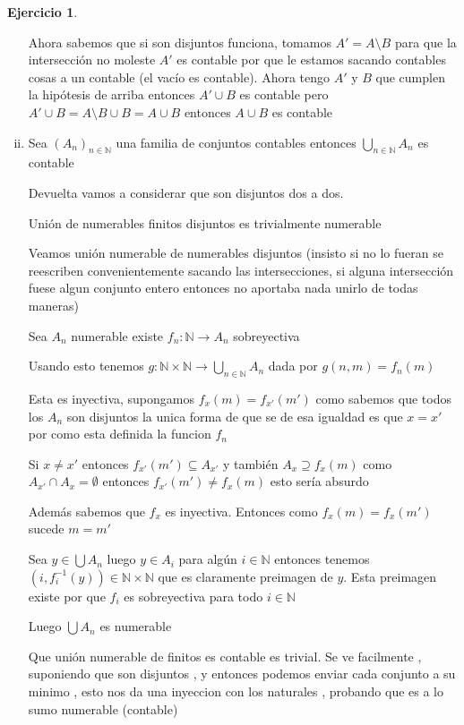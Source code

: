 \documentclass[12pt]{article}
\newcommand{\N}{\mathbb{N}}
\newcommand{\ra}{\rightarrow}
\theoremstyle{definition}
\newtheorem{ej}{Ejercicio}
\begin{document}
\begin{ej}
\begin{enumerate}[i.]
Ahora sabemos que si son disjuntos funciona, tomamos $A' = A \setminus B$ para que la intersección no moleste $A'$ es contable por que le estamos sacando contables cosas a un contable (el vacío es contable). Ahora tengo $A'$ y $B$ que cumplen la hipótesis de arriba entonces $A'\cup B$ es contable pero $A'\cup B = A \setminus B \cup B = A \cup B$ entonces $A \cup B$ es contable
      



  \item Sea $(A_{n})_{n \in \N}$ una familia de conjuntos contables entonces $\bigcup_{n \in \N} A_{n}$ es contable
  
    Devuelta vamos a considerar que son disjuntos dos a dos.

    Unión de numerables finitos disjuntos es trivialmente numerable

    Veamos unión numerable de numerables disjuntos (insisto si no lo fueran se reescriben convenientemente sacando las intersecciones, si alguna intersección fuese algun conjunto entero entonces no aportaba nada unirlo de todas maneras)

    Sea $A_{n}$ numerable existe $f_{n}: \N \ra A_{n}$ sobreyectiva

    Usando esto tenemos $g: \N \times \N \ra \bigcup_{n \in \N} A_{n}$ dada por $g(n,m) = f_{n}(m)$

    Esta es inyectiva, supongamos $f_x(m) = f_{x '}(m')$ como sabemos que todos los $A_n$ son disjuntos la unica forma de que se de esa igualdad es que $x = x '$ por como esta definida la funcion $f_n$

    Si $x\neq x'$ entonces $f_{x'}(m') \subseteq A_{x'}$ y también $A_{x} \supseteq f_{x}(m) $ como $ A_{x'} \cap A_{x} = \emptyset $ entonces $f_{x'}(m') \neq f_x(m)$ esto sería absurdo

    Además sabemos que $f_x$ es inyectiva. Entonces como $f_x(m) = f_{x}(m')$ sucede $m = m'$ 


    Sea $y \in \bigcup A_{n}$ luego $y \in A_{i}$ para algún $i \in \N$ entonces tenemos $(i ,f^{-1}_{i} (y)) \in \N \times \N$ que es claramente preimagen de $y$. Esta preimagen existe por que $f_i$ es sobreyectiva para todo $i \in \N$

    Luego $\bigcup A_{n}$ es numerable

    Que unión numerable de finitos es contable es trivial. Se ve facilmente , suponiendo que son disjuntos , y entonces podemos enviar cada conjunto a su minimo , esto nos da una inyeccion con los naturales , probando que es a lo sumo numerable (contable)


\end{enumerate}
\end{ej}
\end{document}

